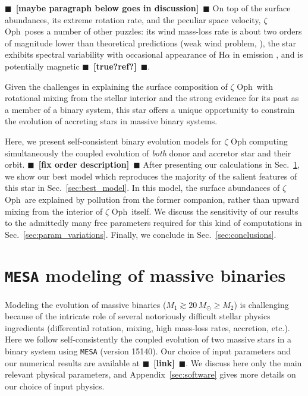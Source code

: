 \documentclass[twocolumn,twocolappendix,trackchanges]{aastex63}
\DeclareRobustCommand{\Secref}[1]{Sec.~\ref{#1}}
\newcommand{\zoph}{$\zeta$ Oph}
\newcommand{\todo}[1]{{\large $\blacksquare$~\textbf{\color{red}[#1]}}~$\blacksquare$}
\begin{document}
\todo{maybe paragraph below goes in discussion}
On top of the surface abundances, its extreme rotation rate, and the
peculiar space velocity, \zoph\ poses a number of other
puzzles: its wind mass-loss rate is about two orders of magnitude
lower than theoretical predictions (weak wind problem,
\citealt{marcolino:09}), the star exhibits spectral variability with
occasional appearance of H$\alpha$ in emission
\citep[e.g.,][]{walker:79}, and is potentially magnetic \todo{true?ref?}.

Given the challenges in explaining the surface composition of \zoph\
with rotational mixing from the stellar interior and the strong
evidence for its past as a member of a binary system, this star offers
a unique opportunity to constrain the evolution of accreting stars in
massive binary systems.

Here, we present self-consistent binary evolution models for
$\zeta$ Oph computing simultaneously the coupled evolution of
\emph{both} donor and accretor star and their orbit. \todo{fix order description} After presenting
our calculations in \Secref{sec:methods}, we show our best model which
reproduces the majority of the salient features of this star in
\Secref{sec:best_model}. In this model, the surface abundances of
\zoph\ are explained by pollution from the former companion, rather
than upward mixing from the interior of \zoph\ itself. We discuss the
sensitivity of our results to the admittedly many free parameters
required for this kind of computations in
\Secref{sec:param_variations}. Finally, we conclude in
\Secref{sec:conclusions}.



\section{ \texttt{MESA} modeling of massive binaries}
\label{sec:methods}

Modeling the evolution of massive binaries
($M_1\gtrsim 20\,M_\odot \geq M_2$) is challenging because of the
intricate role of several notoriously difficult stellar physics
ingredients (differential rotation, mixing, high mass-loss rates,
accretion, etc.). Here we follow self-consistently the coupled
evolution of two massive stars in a binary system using \texttt{MESA}
(version 15140). Our choice of input parameters and our numerical
results are available at \todo{link}. We discuss here only the main
relevant physical parameters, and Appendix~\ref{sec:software} gives
more details on our choice of input physics.
\end{document}
